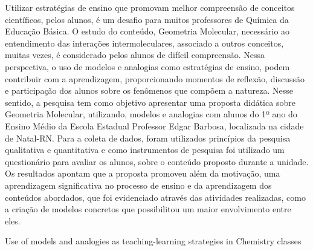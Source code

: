 \begin{refsection}
    \begin{galoResumo}
        Utilizar estratégias de ensino que promovam melhor compreensão de conceitos científicos, pelos alunos, é um desafio para muitos professores de Química da Educação Básica. O estudo do conteúdo, Geometria Molecular, necessário ao entendimento das interações intermoleculares, associado a outros conceitos, muitas vezes, é considerado pelos alunos de difícil compreensão. Nessa perspectiva, o uso de modelos e analogias como estratégias de ensino, podem contribuir com a aprendizagem, proporcionando momentos de reflexão, discussão e participação dos alunos sobre os fenômenos que compõem a natureza. Nesse sentido, a pesquisa tem como objetivo apresentar uma proposta didática sobre Geometria Molecular, utilizando, modelos e analogias com alunos do 1º ano do Ensino Médio da Escola Estadual Professor Edgar Barbosa, localizada na cidade de Natal-RN. Para a coleta de dados, foram utilizados princípios da pesquisa qualitativa e quantitativa e como instrumentos de pesquisa foi utilizado um questionário para avaliar os alunos, sobre o conteúdo proposto durante a unidade. Os resultados apontam que a proposta promoveu além da motivação, uma aprendizagem significativa no processo de ensino e da aprendizagem dos conteúdos abordados, que foi evidenciado através das atividades realizadas, como a criação de modelos concretos que possibilitou um maior envolvimento entre eles.
    \end{galoResumo}
    
    
    \begin{otherlanguage}{english}

    \fakeChapterOneLine
    {Use of models and analogies as teaching-learning strategies in Chemistry classes}


\end{otherlanguage}
\end{refsection}
